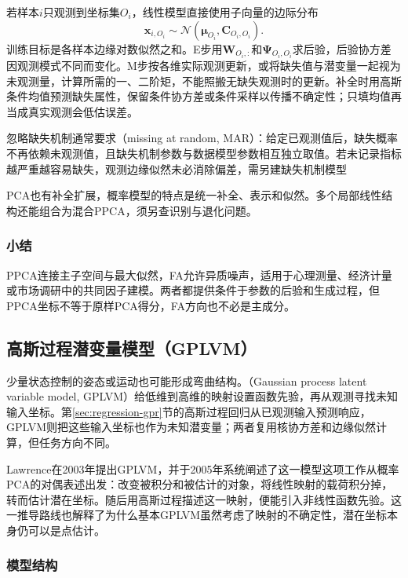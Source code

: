 若样本$i$只观测到坐标集$O_i$，线性模型直接使用子向量的边际分布
\begin{equation}
\label{eq:dim-linear-missing}
\bm{x}_{i,O_i}\sim
\mathcal{N}(\bm{\mu}_{O_i},\bm{C}_{O_i,O_i}).
\end{equation}
训练目标是各样本边缘对数似然之和。E步用$\bm{W}_{O_i,:}$和$\bm{\Psi}_{O_i,O_i}$求后验，后验协方差因观测模式不同而变化。M步按各维实际观测更新，或将缺失值与潜变量一起视为未观测量，计算所需的一、二阶矩，不能照搬无缺失观测时的更新。补全时用高斯条件均值预测缺失属性，保留条件协方差或条件采样以传播不确定性；只填均值再当成真实观测会低估误差。

忽略缺失机制通常要求（missing at random, MAR）：给定已观测值后，缺失概率不再依赖未观测值，且缺失机制参数与数据模型参数相互独立取值。若未记录指标越严重越容易缺失，观测边缘似然未必消除偏差，需另建缺失机制模型

PCA也有补全扩展，概率模型的特点是统一补全、表示和似然。多个局部线性结构还能组合为混合PPCA，须另查识别与退化问题。

\subsubsection{小结}
\label{sec:dim-ppca-summary}

PPCA连接主子空间与最大似然，FA允许异质噪声，适用于心理测量、经济计量或市场调研中的共同因子建模。两者都提供条件于参数的后验和生成过程，但PPCA坐标不等于原样PCA得分，FA方向也不必是主成分。

\subsection{高斯过程潜变量模型（GPLVM）}
\label{sec:dim-gplvm}

少量状态控制的姿态或运动也可能形成弯曲结构。（Gaussian process latent variable model, GPLVM）给低维到高维的映射设置函数先验，再从观测寻找未知输入坐标。第\ref{sec:regression-gpr}节的高斯过程回归从已观测输入预测响应，GPLVM则把这些输入坐标也作为未知潜变量；两者复用核协方差和边缘似然计算，但任务方向不同。

Lawrence在2003年提出GPLVM，并于2005年系统阐述了这一模型这项工作从概率PCA的对偶表述出发：改变被积分和被估计的对象，将线性映射的载荷积分掉，转而估计潜在坐标。随后用高斯过程描述这一映射，便能引入非线性函数先验。这一推导路线也解释了为什么基本GPLVM虽然考虑了映射的不确定性，潜在坐标本身仍可以是点估计。

\subsubsection{模型结构}
\label{sec:dim-gplvm-structure}

